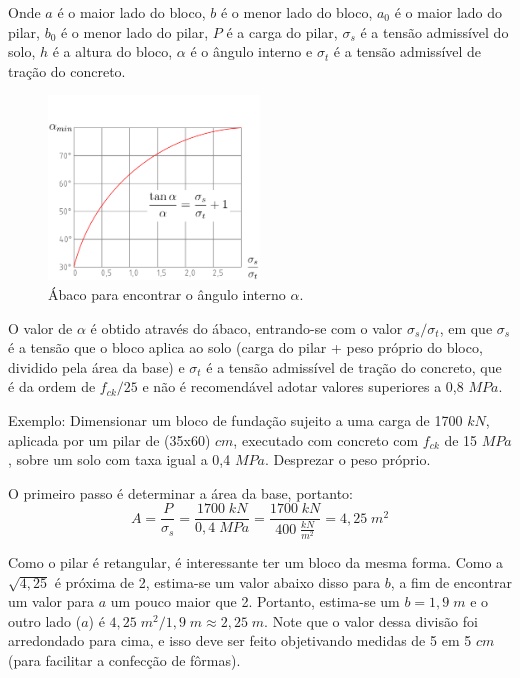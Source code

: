 Onde $a$ é o maior lado do bloco, $b$ é o menor lado do bloco, $a_0$ é o maior lado do pilar, $b_0$ é o menor lado do pilar, $P$ é a carga do pilar, $\sigma_s$ é a tensão admissível do solo, $h$ é a altura do bloco, $\alpha$ é o ângulo interno e $\sigma_t$ é a tensão admissível de tração do concreto.

\begin{figure}[htb]
	\begin{center}
	\caption{Ábaco para encontrar o ângulo interno $\alpha$.}
    	\includegraphics[width=0.5\textwidth]{Fundacoes-rasas-ou-diretas/Imagens/Abaco-bloco-de-fundacao.png}
	\end{center}
\end{figure}

O valor de $\alpha$ é obtido através do ábaco, entrando-se com o valor $\sigma_s/\sigma_t$, em que $\sigma_s$ é a tensão que o bloco aplica ao solo (carga do pilar + peso próprio do bloco, dividido pela área da base) e $\sigma_t$ é a tensão admissível de tração do concreto, que é da ordem de $f_{ck}/25$ e não é recomendável adotar valores superiores a 0,8 $MPa$.

Exemplo: Dimensionar um bloco de fundação sujeito a uma carga de 1700 $kN$, aplicada por um pilar de (35x60) $cm$, executado com concreto com $f_{ck}$ de 15 $MPa$, sobre um solo com taxa igual a 0,4 $MPa$. Desprezar o peso próprio.

O primeiro passo é determinar a área da base, portanto: $$A=\frac{P}{\sigma_s}=\frac{1700\;kN}{0,4\;MPa}=\frac{1700\;kN}{400\;\frac{kN}{m^2}}=4,25\;m^2$$

Como o pilar é retangular, é interessante ter um bloco da mesma forma. Como a $\sqrt{4,25}$ é próxima de 2, estima-se um valor abaixo disso para $b$, a fim de encontrar um valor para $a$ um pouco maior que 2. Portanto, estima-se um $b=1,9\;m$ e o outro lado ($a$) é $4,25\;m^2/1,9\;m\approx 2,25\;m$. Note que o valor dessa divisão foi arredondado para cima, e isso deve ser feito objetivando medidas de 5 em 5 $cm$ (para facilitar a confecção de fôrmas).

